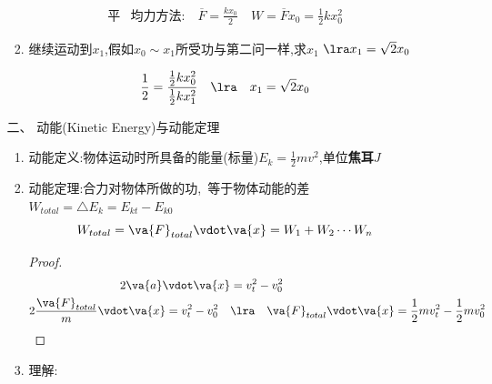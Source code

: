 \documentclass{article}
\begin{document}
\begin{itemize}
\begin{enumerate}
\begin{enumerate}[label=(\arabic*)]
\begin{align*}
                                \text{平}        & \text{均力方法:} \quad \overline{F} = \frac{kx_{0}}{2} \quad W = \overline{F} x_{0} = \frac{1}{2}kx_{0}^{2}
                            \end{align*}
                      \item 继续运动到$x_{1}$,假如$x_{0} \sim x_{1}$所受功与第二问一样,求$x_{1}$ $\lra x_{1} = \sqrt{2}x_{0}$
                      \item[]
                          \begin{align*}
                              \dfrac{1}{2} = \dfrac{\frac{1}{2}kx_{0}^{2}}{\frac{1}{2}kx_{1}^{2}} \quad \lra \quad x_{1} = \sqrt{2} x_{0}
                          \end{align*}
                  \end{enumerate}

                  \vspace{2em}

              \item[二、] 动能(Kinetic Energy)与动能定理
                  \begin{enumerate}
                      \item 动能定义:物体运动时所具备的能量(标量)$E_{k} = \frac{1}{2}mv^{2}$,单位\textbf{焦耳$J$}
                      \item 动能定理:合力对物体所做的功,\
                            等于物体动能的差$W_{total} = \triangle E_{k} = E_{kt} - E_{k0}$
                            $$
                                W_{total} = \va{F}_{total} \vdot \va{x} = W_{1} + W_{2} \cdots W_{n}
                            $$

                            \begin{proof}
                                \begin{align*}
                                    2\va{a} \vdot \va{x}                                                    & = v_{t}^{2} - v_{0}^{2}                                                                \\
                                    2 \dfrac{\va{F}_{total}}{m} \vdot \va{x} = v_{t}^{2} - v_{0}^{2}  \quad & \lra  \quad \va{F}_{total} \vdot \va{x} = \frac{1}{2}mv_{t}^{2} -\frac{1}{2}mv_{0}^{2}
                                \end{align*}
                            \end{proof}

                      \item 理解:


\end{enumerate}
\end{enumerate}
\end{itemize}
\end{document}
